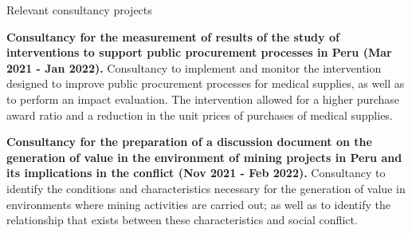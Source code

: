 \documentclass{resume} %
\begin{document}
\begin{rSection}{Relevant consultancy projects}
\item \textbf{Consultancy for the measurement of results of the study of interventions to support public procurement processes in Peru (Mar 2021 - Jan 2022).} {Consultancy to implement and monitor the intervention designed to improve public procurement processes for medical supplies, as well as to perform an impact evaluation. The intervention allowed for a higher purchase award ratio and a reduction in the unit prices of purchases of medical supplies.}
\item \textbf{Consultancy for the preparation of a discussion document on the generation of value in the environment of mining projects in Peru and its implications in the conflict (Nov 2021 - Feb 2022).} {Consultancy to identify the conditions and characteristics necessary for the generation of value in environments where mining activities are carried out; as well as to identify the relationship that exists between these characteristics and social conflict.}


\end{rSection}
\end{document}
